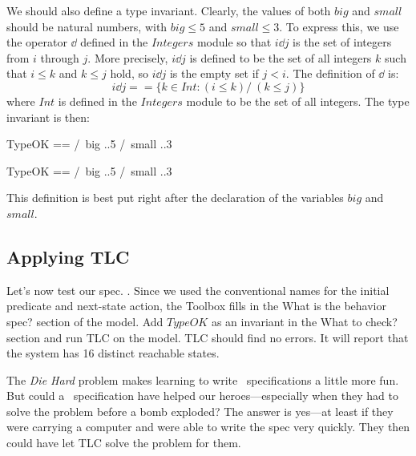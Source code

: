 \documentclass[fleqn,leqno]{article}
\begin{document}
 \medskip
We should also define a type invariant.  Clearly, the values of
both $big$ and $small$ should be natural numbers, with $big\leq 5$
and $small\leq3$.  To express this, we use the operator 
$\dd$ defined in the $Integers$ module so that $i\dd j$ is the set of
integers from $i$ through $j$.  More precisely, $i\dd j$ is defined to
be the set of all integers $k$ such that $i\leq k$ and $k\leq j$ hold,
so $i\dd j$ is the empty set if $j<i$.  The definition of $\dd$ is:%
 \[ i \dd j == \{k \in Int : (i \leq k) /\ (k \leq j)\}
 \]
where 
$Int$ is defined in the $Integers$ module to be the set of all
integers.   The type invariant is then:
 \medskip
\begin{twocols}
\begin{notla}
TypeOK == /\ big   ..5
          /\ small ..3 
\end{notla}
\begin{tlatex}
%
%
\end{tlatex}
\midcol
\begin{verbatim*}
TypeOK == /\ big   ..5
          /\ small ..3 
\end{verbatim*}
\end{twocols}
 \medskip
This definition is best put right after the declaration of the
variables $big$ and $small$.

\subsection{Applying TLC}


Let's now test our spec.  .  Since we used the conventional names for the initial
predicate and next-state action, the Toolbox fills in the
\textsf{What is the behavior spec?} section of the model.  Add 
$TypeOK$ as an invariant in the \textsf{What to check?} section
and run TLC on the model.  TLC should find no errors.  It will 
report that the system has 16 distinct reachable states.

The \emph{Die Hard} problem makes learning to write \tlaplus\
specifications a little more fun.  But could a \tlaplus\ specification
have helped our heroes---especially when they had to solve the problem
before a bomb exploded?  The answer is yes---at least if they were
carrying a computer and were able to write the spec very quickly.
They then could have let TLC solve the problem for them.
\end{document}

